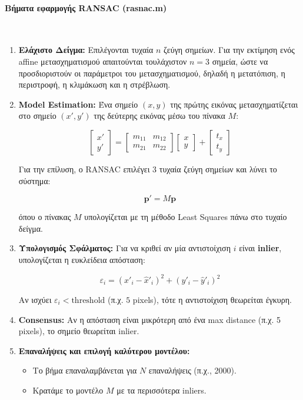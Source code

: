 \documentclass[12pt]{article}
\begin{document}
\paragraph{Βήματα εφαρμογής RANSAC (rasnac.m)}
\mbox{}\\
\begin{enumerate}
  \item \textbf{Ελάχιστο Δείγμα: }
  Επιλέγονται τυχαία $n$ ζεύγη σημείων. Για την εκτίμηση ενός affine μετασχηματισμού
  απαιτούνται τουλάχιστον $n = 3$ σημεία, ώστε να προσδιοριστούν οι παράμετροι
  του μετασχηματισμού, δηλαδή η μετατόπιση, η περιστροφή, η κλιμάκωση και η στρέβλωση.
  
  \item \textbf{Model Estimation: } Ένα σημείο $(x, y)$ της πρώτης εικόνας μετασχηματίζεται στο σημείο $(x', y')$ 
  της δεύτερης εικόνας μέσω του πίνακα $M$:

  \[
  \begin{bmatrix}
  x' \\
  y'
  \end{bmatrix}
  =
  \begin{bmatrix}
  m_{11} & m_{12} \\
  m_{21} & m_{22}
  \end{bmatrix}
  \begin{bmatrix}
  x \\
  y
  \end{bmatrix}
  +
  \begin{bmatrix}
  t_x \\
  t_y
  \end{bmatrix}
  \]
  
  Για την επίλυση, ο RANSAC επιλέγει 3 τυχαία ζεύγη σημείων και λύνει το σύστημα:
  
  \[
  \mathbf{p}' = M \mathbf{p}
  \]
  
  όπου ο πίνακας $M$ υπολογίζεται με τη μέθοδο Least Squares πάνω στο τυχαίο δείγμα.
  

  \item \textbf{Υπολογισμός Σφάλματος: } Για να κριθεί αν μία αντιστοίχιση $i$ είναι \textbf{inlier}, υπολογίζεται η ευκλείδεια απόσταση:
  
  \[
  \varepsilon_i
  =
  (x'_i - \hat{x}'_i)^2 + (y'_i - \hat{y}'_i)^2
  \]
  
  Αν ισχύει $\varepsilon_i < \text{threshold}$ (π.χ. $5$ pixels), τότε η αντιστοίχιση θεωρείται έγκυρη.
  
  \item \textbf{Consensus: } Αν η απόσταση είναι μικρότερη από ένα max distance (π.χ. 5 pixels), το σημείο θεωρείται inlier.
  \item \textbf{Επαναλήψεις και επιλογή καλύτερου μοντέλου: }
  \begin{itemize}
      \item Το βήμα επαναλαμβάνεται για $N$ επαναλήψεις (π.χ., 2000).
      \item Κρατάμε το μοντέλο $M$ με τα περισσότερα inliers.
  \end{itemize}
\end{enumerate}
\end{document}
